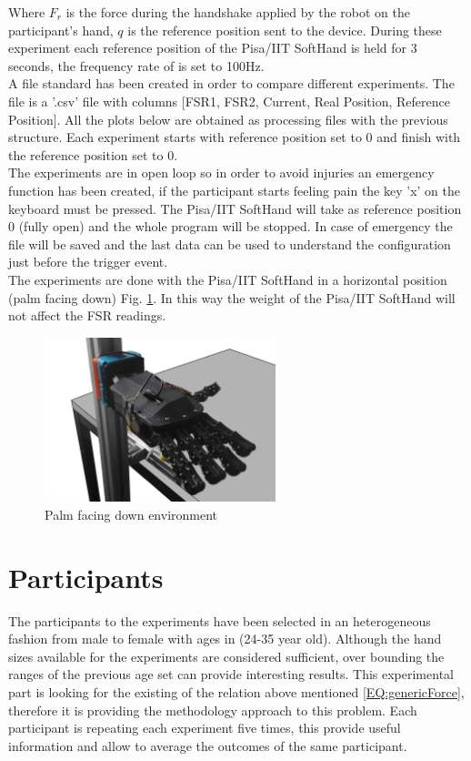 Where $F_r$ is the force during the handshake applied by the robot on the participant's hand, $q$ is the reference position sent to the device.
During these experiment each reference position of the Pisa/IIT SoftHand is held for 3 seconds, the frequency rate of is set to 100Hz. \\
A file standard has been created in order to compare different experiments. The file is a '.csv' file with columns [FSR1, FSR2, Current, Real Position, Reference Position]. All the plots below are obtained as processing files with the previous structure. Each experiment starts with reference position set to 0 and finish with the reference position set to 0. \\
The experiments are in open loop so in order to avoid injuries an emergency function has been created, if the participant starts feeling pain the key 'x' on the keyboard must be pressed. The Pisa/IIT SoftHand will take as reference position 0 (fully open) and the whole program will be stopped.
In case of emergency the file will be saved and the last data can be used to understand the configuration just before the trigger event.\\
The experiments are done with the Pisa/IIT SoftHand in a horizontal position (palm facing down) Fig. \ref{Fig:palmdown}. In this way the weight of the Pisa/IIT SoftHand will not affect the FSR readings. 

\begin{figure}[ht]
\centering
\includegraphics[width=0.6\textwidth]{Figure/stand.png}
\caption{Palm facing down environment}
\label{Fig:palmdown}
\end{figure}

\section*{Participants}\label{sec:participants}
The participants to the experiments have been selected in an heterogeneous fashion from male to female with ages in (24-35 year old). Although the hand sizes available for the experiments are considered sufficient, over bounding the ranges of the previous age set can provide interesting results.
This experimental part is looking for the existing of the relation above mentioned \ref{EQ:genericForce}, therefore it is providing the methodology approach to this problem.
Each participant is repeating each experiment five times, this provide useful information and allow to average the outcomes of the same participant.

